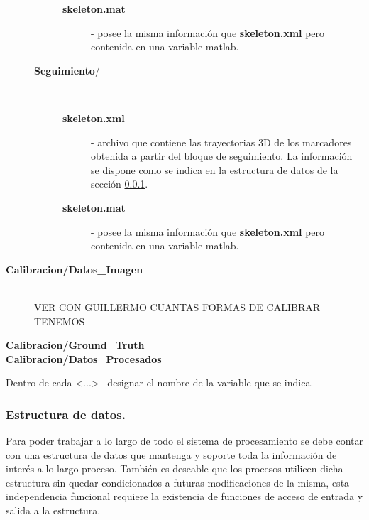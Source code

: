\begin{description}
\begin{description}
\begin{description}
			\item[{\small\textbf{\textsf{skeleton.mat}}}] - posee la misma información que {\small\textbf{\textsf{skeleton.xml}}} pero contenida en una variable matlab.
		\end{description}
	\item[{\small\textbf{\textsf{Seguimiento}}}/] \hfill \\ \vspace{-0.5cm}
		\begin{description}
				\item[{\small\textbf{\textsf{skeleton.xml}}}] - archivo que contiene las trayectorias 3D de los marcadores obtenida a partir del bloque de seguimiento. La información se dispone como se indica en la estructura de datos de la sección \ref{section_Estructura_de_datos}. 
				\item[{\small\textbf{\textsf{skeleton.mat}}}] - posee la misma información que {\small\textbf{\textsf{skeleton.xml}}} pero contenida en una variable matlab.
		\end{description}
	\end{description}
\item[{\small\textbf{\textsf{Calibracion/Datos\_Imagen}}}] \hfill \\
VER CON GUILLERMO CUANTAS FORMAS DE CALIBRAR TENEMOS \vspace{-0.2cm}
\item[{\small\textbf{\textsf{Calibracion/Ground\_Truth}}}] 
\item[{\small\textbf{\textsf{Calibracion/Datos\_Procesados}}}] 
\end{description}

Dentro de cada <...>  ~designar el nombre de la variable que se indica.


\subsubsection{Estructura de datos.}
\label{section_Estructura_de_datos}
Para poder trabajar a lo largo de todo el sistema de procesamiento se debe contar con una estructura de datos que mantenga y soporte toda la información de interés a lo largo proceso. También es deseable que los procesos utilicen dicha estructura sin quedar condicionados a futuras modificaciones de la misma, esta independencia funcional requiere la existencia de funciones de acceso de entrada y salida a la estructura.  


